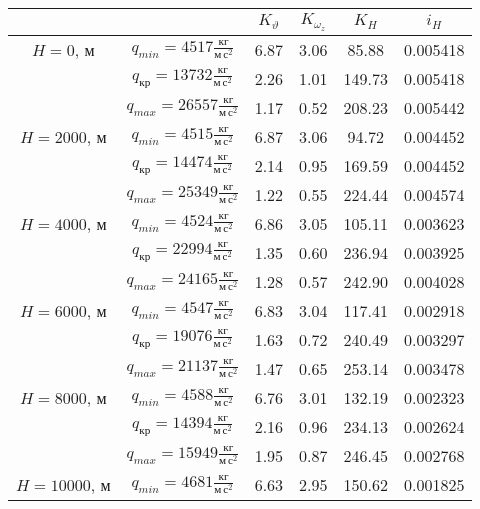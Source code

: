 \begin{tabular}{|c|c|c|c|c|c|}
\hline
             &                                    & $K_{\vartheta}$ & $K_{\omega_z}$ & $K_{H}$ &     $i_H$ \\
\hline
$H=0$, м & $q_{min}= 4517 \frac{кг}{м \,с^2}$ &            6.87 &           3.06 &   85.88 &  0.005418 \\
             & $q_{кр}= 13732 \frac{кг}{м \,с^2}$ &            2.26 &           1.01 &  149.73 &  0.005418 \\
             & $q_{max}= 26557 \frac{кг}{м \,с^2}$ &            1.17 &           0.52 &  208.23 &  0.005442 \\\hline
$H=2000$, м & $q_{min}= 4515 \frac{кг}{м \,с^2}$ &            6.87 &           3.06 &   94.72 &  0.004452 \\
             & $q_{кр}= 14474 \frac{кг}{м \,с^2}$ &            2.14 &           0.95 &  169.59 &  0.004452 \\
             & $q_{max}= 25349 \frac{кг}{м \,с^2}$ &            1.22 &           0.55 &  224.44 &  0.004574 \\\hline
$H=4000$, м & $q_{min}= 4524 \frac{кг}{м \,с^2}$ &            6.86 &           3.05 &  105.11 &  0.003623 \\
             & $q_{кр}= 22994 \frac{кг}{м \,с^2}$ &            1.35 &           0.60 &  236.94 &  0.003925 \\
             & $q_{max}= 24165 \frac{кг}{м \,с^2}$ &            1.28 &           0.57 &  242.90 &  0.004028 \\\hline
$H=6000$, м & $q_{min}= 4547 \frac{кг}{м \,с^2}$ &            6.83 &           3.04 &  117.41 &  0.002918 \\
             & $q_{кр}= 19076 \frac{кг}{м \,с^2}$ &            1.63 &           0.72 &  240.49 &  0.003297 \\
             & $q_{max}= 21137 \frac{кг}{м \,с^2}$ &            1.47 &           0.65 &  253.14 &  0.003478 \\\hline
$H=8000$, м & $q_{min}= 4588 \frac{кг}{м \,с^2}$ &            6.76 &           3.01 &  132.19 &  0.002323 \\
             & $q_{кр}= 14394 \frac{кг}{м \,с^2}$ &            2.16 &           0.96 &  234.13 &  0.002624 \\
             & $q_{max}= 15949 \frac{кг}{м \,с^2}$ &            1.95 &           0.87 &  246.45 &  0.002768 \\\hline
$H=10000$, м & $q_{min}= 4681 \frac{кг}{м \,с^2}$ &            6.63 &           2.95 &  150.62 &  0.001825 \\

\end{tabular}
